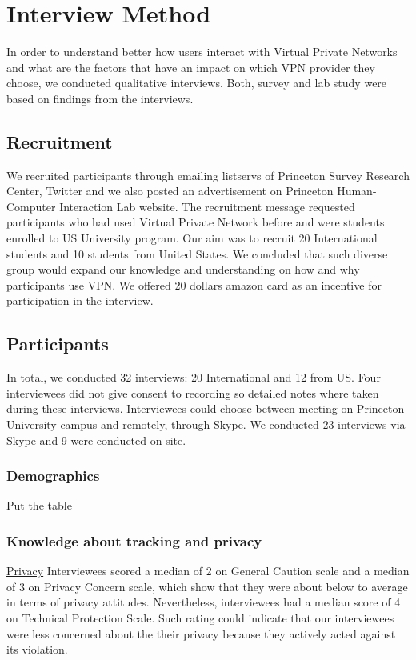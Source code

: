 \section{Interview Method}\label{Method}
In order to understand better how users interact with Virtual Private Networks and what are the factors that have an impact on which VPN provider they choose, we conducted qualitative interviews. Both, survey and lab study were based on findings from the interviews.
\subsection{Recruitment}
We recruited participants through emailing listservs of Princeton Survey Research Center, Twitter and we also posted an advertisement on Princeton Human-Computer Interaction Lab website. The recruitment message requested participants who had used Virtual Private Network before and were students enrolled to US University program. Our aim was to recruit 20 International students and 10 students from United States. We concluded that such diverse group would expand our knowledge and understanding on how and why participants use VPN. We offered 20 dollars amazon card as an incentive for participation in the interview.
\subsection{Participants}
In total, we conducted 32 interviews: 20 International and 12 from US. Four interviewees did not give consent to recording so detailed notes where taken during these interviews. Interviewees could choose between meeting on Princeton University campus and remotely, through Skype. We conducted 23 interviews via Skype and 9 were conducted on-site. 

\subsubsection{Demographics} Put the table

\subsubsection{Knowledge about tracking and privacy}
\label{sec:methods-tracking}

\underline{Privacy}
Interviewees scored a median of 2 on General Caution scale and a median of 3 on Privacy Concern scale, which show that they were about below to average in terms of privacy attitudes. Nevertheless, interviewees had a median score of 4 on Technical Protection Scale. Such rating could indicate that our interviewees were less concerned  about the their privacy because they actively acted against its violation. 

